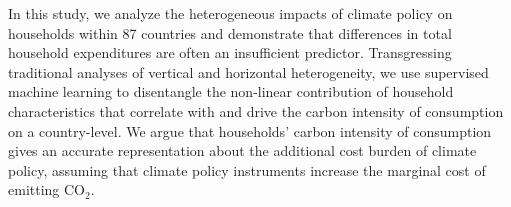 \documentclass[12pt, a4paper]{article}
\begin{document}

In this study, we analyze the heterogeneous impacts of climate policy on households within 87 countries and demonstrate that differences in total household expenditures are often an insufficient predictor. Transgressing traditional analyses of vertical and horizontal heterogeneity, we use supervised machine learning to disentangle the non-linear contribution of household characteristics that correlate with and drive the carbon intensity of consumption on a country-level. We argue that households' carbon intensity of consumption gives an accurate representation about the additional cost burden of climate policy, assuming that climate policy instruments increase the marginal cost of emitting CO$_{2}$.


\end{document}
